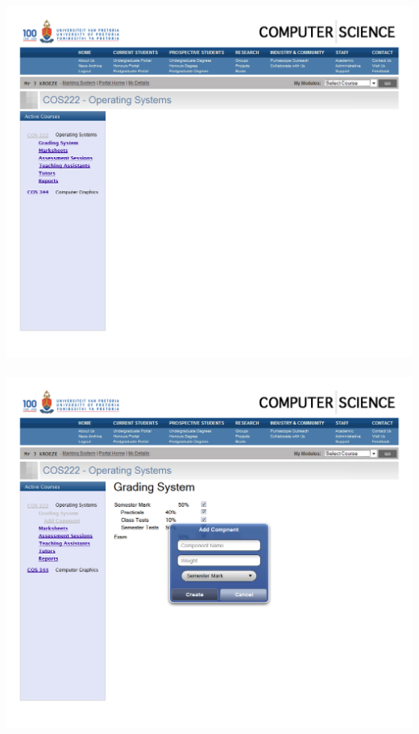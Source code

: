 \documentclass[12pt,a4paper]{article}
\begin{document}
\includegraphics[scale=0.3]{./WebUI/5.png}\\\\
\includegraphics[scale=0.3]{./WebUI/6.png}\\\\
\end{document}
